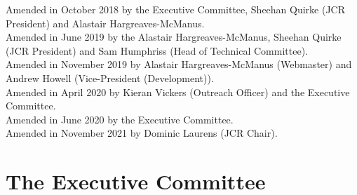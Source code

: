 \documentclass[12pt]{article}
\begin{document}
Amended in October 2018 by the Executive Committee, Sheehan Quirke (JCR President) and Alastair Hargreaves-McManus.\\
Amended in June 2019 by the Alastair Hargreaves-McManus, Sheehan Quirke (JCR President) and Sam Humphriss (Head of Technical Committee).\\
Amended in November 2019 by Alastair Hargreaves-McManus (Webmaster) and Andrew Howell (Vice-President (Development)).\\
Amended in April 2020 by Kieran Vickers (Outreach Officer) and the Executive Committee.\\
Amended in June 2020 by the Executive Committee.\\
Amended in November 2021 by Dominic Laurens (JCR Chair).
\newpage
\tableofcontents{}
\newpage
\section{The Executive Committee}
\end{document}
